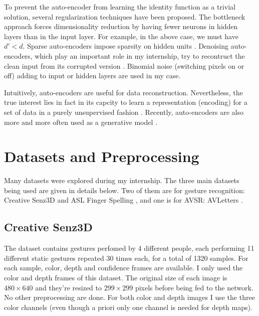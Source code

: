 To prevent the auto-encoder from learning the identity function as
a trivial solution, several regularization techniques have been proposed.
The bottleneck approach forces dimensionality reduction by having
fewer neurons in hidden layers than in the input layer. For example,
in the above case, we must have $d'<d$. Sparse auto-encoders impose sparsity
on hidden units \cite{A. Makhzani 2014}.
Denoising auto-encoders, which play an important role in my internship,
try to recontruct the clean input from its corrupted version
\cite{P. Vincent 2008, Y. Bengio 2012}. Binomial noise
(switching pixels on or off) adding
to input or hidden layers are used in my case.

Intuitively, auto-encoders are useful for data reconstruction.
Nevertheless, the true interest lies in fact in its capcity to learn
a representation (encoding) for a set of data in a purely unsupervised
fashion \cite{P. Vincent 2010}. Recently, auto-encoders are also
more and more often used as a generative model \cite{Y. Bengio 2013}.

\section{Datasets and Preprocessing}

Many datasets were explored during my internship. The three main datasets
being used are given in details  below. Two of them are for gesture
recognition:
Creative Senz3D \cite{A. Memo 2015, A. Memo 2017} and ASL Finger Spelling
\cite{N. Pugeault 2011}, and one is for AVSR: AVLetters
\cite{I. Matthews 2002}.

\subsection{Creative Senz3D}

The dataset contains gestures perfomed by 4 different people, each
performing 11 different static gestures repeated 30 times each,
for a total of 1320 samples.
For each sample, color, depth and confidence frames are available.
I only used the color and depth frames of this dataset. The original
size of each image is $480 \times 640$ and they're resized to
$299 \times 299$ pixels before being fed to the network. No other
preprocessing are done. For both color and depth images I use the three
color channels (even though a priori only one channel is needed for
depth maps).

